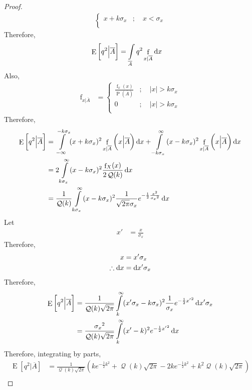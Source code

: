\documentclass[titlepage, fleqn, a4paper, 12pt, twoside]{article}
\theoremstyle{definition}
\theoremstyle{theorem}
\DeclareMathOperator{\pdf}{\mathrm{f}}
\DeclareMathOperator{\prob}{\mathrm{P}}
\DeclareMathOperator{\expct}{\mathrm{E}}
\DeclareMathOperator{\Q}{\mathcal{Q}}
\begin{document}
\begin{proof}
\begin{align*}
\begin{cases}
				x + k \sigma_x &;\quad x < \sigma_x\\
			\end{cases}
	\end{align*}
	Therefore,
	\begin{align*}
		\expct\left[ q^2 \Big| \overline{A} \right] &= \int\limits_{\overline{A}} q^2 \pdf_{x | \overline{A}} \dif x
	\end{align*}
	Also,
	\begin{align*}
		\pdf_{x | \overline{A}} &=
			\begin{cases}
				\frac{\pdf_x(x)}{\prob\left( \overline{A} \right)} &;\quad |x| > k \sigma_x\\
				0 &;\quad |x| > k \sigma_x\\
			\end{cases}
	\end{align*}
	Therefore,
	\begin{align*}
		\expct\left[ q^2 \Big| \overline{A} \right] &= \int\limits_{-\infty}^{-k \sigma_x} (x + k \sigma_x)^2 \pdf_{x | \overline{A}}\left( x \Big| \overline{A} \right) \dif x + \int\limits_{-k \sigma_x}^{\infty} (x - k \sigma_x)^2 \pdf_{x | \overline{A}}\left( x \Big| \overline{A} \right) \dif x\\
		&= 2 \int\limits_{k \sigma_x}^{\infty} (x - k \sigma_x)^2 \frac{\pdf_X(x)}{2 \Q(k)} \dif x\\
		&= \frac{1}{\Q(k)} \int\limits_{k \sigma_x}^{\infty} (x - k \sigma_x)^2 \frac{1}{\sqrt{2 \pi} \sigma_x} e^{-\frac{1}{2} \frac{x^2}{{\sigma_x}^2}} \dif x
	\end{align*}
	Let
	\begin{align*}
		x' &= \frac{x}{\sigma_x}
	\end{align*}
	Therefore,
	\begin{align*}
		x &= x' \sigma_x\\
		\therefore \dif x &= \dif x' \sigma_x
	\end{align*}
	Therefore,
	\begin{align*}
		\expct\left[ q^2 \Big| \overline{A} \right] &= \frac{1}{\Q(k) \sqrt{2 \pi}} \int\limits_{k}^{\infty} (x' \sigma_x - k \sigma_x)^2 \frac{1}{\sigma_x} e^{-\frac{1}{2} {x'}^2} \dif x' \sigma_x\\
		&= \frac{{\sigma_x}^2}{\Q(k) \sqrt{2 \pi}} \int\limits_{k}^{\infty} (x' - k)^2 e^{-\frac{1}{2} {x'}^2} \dif x
	\end{align*}
	Therefore, integrating by parts,
	\begin{align*}
		\expct\left[ q^2 \Big| \overline{A} \right] &= \frac{1}{\Q(k) \sqrt{2 \pi}} \left( k e^{-\frac{1}{2} k^2} + \Q(k) \sqrt{2 \pi} - 2 k e^{-\frac{1}{2} k^2} + k^2 \Q(k) \sqrt{2 \pi} \right)\\

\end{align*}
\end{proof}
\end{document}
